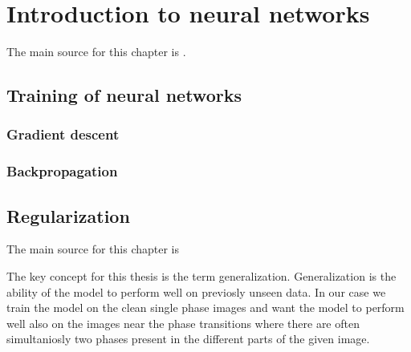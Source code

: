 \chapter{Introduction to neural networks}
\label{chap2}


The main source for this chapter is \cite{bengio2017deep}.







\section{Training of neural networks}

\subsection{Gradient descent}



\subsection{Backpropagation}


\section{Regularization}


The main source for this chapter is \cite{bengio2017deep}

The key concept for this thesis is the term generalization. Generalization is the ability of the model to perform well on previosly unseen data. In our case we train the model on the clean single phase images and want the model to perform well also on the images near the phase transitions where there are often simultaniosly two phases present in the different parts of the given image. 

